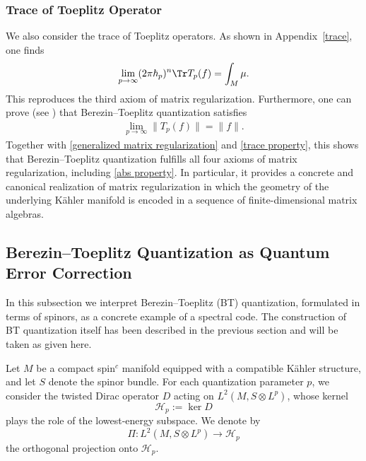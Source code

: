 \documentclass[12pt]{article}
\theoremstyle{definition} %
\theoremstyle{plain} %
\theoremstyle{remark} %
\theoremstyle{underline}
\begin{document}
\subsubsection{Trace of Toeplitz Operator}

We also consider the trace of Toeplitz operators.
As shown in Appendix~\ref{trace}, one finds
\begin{align}
    \label{trace property}
    \lim_{p \to \infty} (2\pi\hbar_p)^n \Tr T_p(f) = \int_M  \mu.
\end{align}
This reproduces the third axiom of matrix regularization.
Furthermore, one can prove (see \cite{hawkins2000geometric}) that Berezin--Toeplitz quantization satisfies
\begin{align}
    \label{abs property}
    \lim_{p\to \infty} \|T_p(f)\| = \| f\| .
\end{align}
Together with \eqref{generalized matrix regularization} and \eqref{trace property}, this shows that Berezin--Toeplitz quantization fulfills all four axioms of matrix regularization, including \eqref{abs property}.
In particular, it provides a concrete and canonical realization of matrix regularization in which the geometry of the underlying K\"ahler manifold is encoded in a sequence of finite-dimensional matrix algebras.

\subsection{Berezin--Toeplitz Quantization as Quantum Error Correction}

In this subsection we interpret Berezin--Toeplitz (BT) quantization, formulated in terms of spinors, as a concrete example of a spectral code.
The construction of BT quantization itself has been described in the previous section and will be taken as given here.

Let $M$ be a compact spin$^c$ manifold equipped with a compatible K\"ahler structure, and let $S$ denote the spinor bundle.
For each quantization parameter $p$, we consider the twisted Dirac operator $D$ acting on $L^2(M,S\otimes L^p)$, whose kernel
\[
    \mathcal H_p := \ker D
\]
plays the role of the lowest-energy subspace.
We denote by
\[
    \Pi : L^2(M,S\otimes L^p) \to \mathcal H_p
\]
the orthogonal projection onto $\mathcal H_p$.
\end{document}
